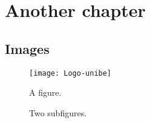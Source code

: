 \chapter{Another chapter}
\section{Images}
\begin{figure}[!h]
	\centering
	\texttt{[image: Logo-unibe]}
	\caption{\small A figure.}
	\label{fig:1}
\end{figure}

\begin{figure}[!h]
	\centering
	\qquad %
	\caption{\small Two subfigures. }
	\label{fig:2}
\end{figure}